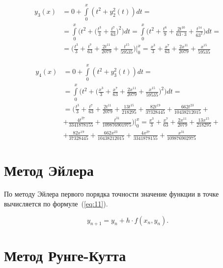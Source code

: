 \begin{equation}\label{eq:09}
    \begin{split}
        y_3(x) &= 0 + \int\limits_0^x(t^2 + y_2^2(t))dt = \\ &=
        \int\limits_0^x\bigg(t^2 + \bigg(\frac{t^3}{3} +
        \frac{t^7}{63}\bigg)^2\bigg) dt = \int\limits_0^x\bigg(t^2 +
        \frac{t^6}{9} + \frac{2t^{10}}{63 \cdot 3} + \frac{t^{14}}{63^2}\bigg) dt =
        \\ &= \bigg(\frac{t^3}{3} + \frac{t^7}{63} + \frac{2t^{11}}{2079} +
        \frac{t^{15}}{59535}\bigg)\bigg|_0^x = \frac{x^3}{3} + \frac{x^7}{63} +
        \frac{2x^{11}}{2079} + \frac{x^{15}}{59535}
    \end{split}
\end{equation}

\begin{equation}\label{eq:10}
    \begin{split}
        y_4(x) &= 0 + \int\limits_0^x(t^2 + y_3^2(t))dt = \\ &=
        \int\limits_0^x\bigg(t^2 + \bigg(\frac{x^3}{3} + \frac{x^7}{63} +
        \frac{2x^{11}}{2079} + \frac{x^{15}}{59535}\bigg)^2\bigg) dt = \\ &=
        \bigg(\frac{t^3}{3} + \frac{t^7}{63} + \frac{2t^{11}}{2079} +
        \frac{13t^{15}}{218295} +  \frac{82t^{19}}{37328445} +
        \frac{662t^{23}}{10438212015} + \\ & + \frac{4t^{27}}{3341878155} +
        \frac{t^{31}}{109876901975}\bigg)\bigg|_0^x =
        \frac{x^3}{3} + \frac{x^7}{63} + \frac{2x^{11}}{2079} +
        \frac{13x^{15}}{218295} + \\ &+ \frac{82x^{19}}{37328445} +
        \frac{662x^{23}}{10438212015} + \frac{4x^{27}}{3341878155} +
        \frac{x^{31}}{109876902975}
    \end{split}
\end{equation}

\section{Метод Эйлера}

По методу Эйлера первого порядка точности значение функции в точке
вычисляется по формуле~(\ref{eq:11}).

\begin{equation}\label{eq:11}
    y_{n+1} = y_n + h \cdot f(x_n, y_n).
\end{equation}

\section{Метод Рунге-Кутта}


